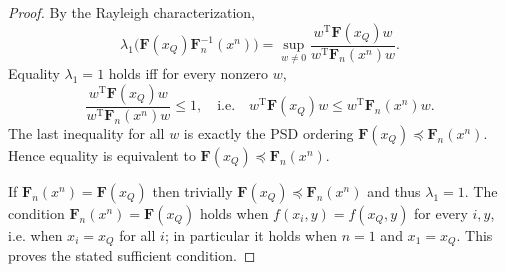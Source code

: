 \documentclass{article} %
\theoremstyle{plain} %
\begin{document}
\begin{proof}
By the Rayleigh characterization,
\[
\lambda_1\!\big(\mathbf F(x_Q)\mathbf F_n^{-1}(x^n)\big)
=\sup_{w\ne0}\frac{w^\mathrm{T} \mathbf F(x_Q) w}{w^\mathrm{T} \mathbf F_n(x^n) w}.
\]
Equality \(\lambda_1=1\) holds iff for every nonzero \(w\),
\[
\frac{w^\mathrm{T} \mathbf F(x_Q) w}{w^\mathrm{T} \mathbf F_n(x^n) w}\le 1,
\quad\text{i.e.}\quad
w^\mathrm{T} \mathbf F(x_Q) w \le w^\mathrm{T} \mathbf F_n(x^n) w.
\]
The last inequality for all \(w\) is exactly the PSD ordering \(\mathbf F(x_Q)\preceq\mathbf F_n(x^n)\). Hence equality is equivalent to \(\mathbf F(x_Q)\preceq\mathbf F_n(x^n)\).

If \(\mathbf F_n(x^n)=\mathbf F(x_Q)\) then trivially \(\mathbf F(x_Q)\preceq\mathbf F_n(x^n)\) and thus \(\lambda_1=1\). The condition \(\mathbf F_n(x^n)=\mathbf F(x_Q)\) holds when \(f(x_i,y)=f(x_Q,y)\) for every \(i,y\), i.e. when \(x_i=x_Q\) for all \(i\); in particular it holds when \(n=1\) and \(x_1=x_Q\). This proves the stated sufficient condition.
\end{proof}
\end{document}
